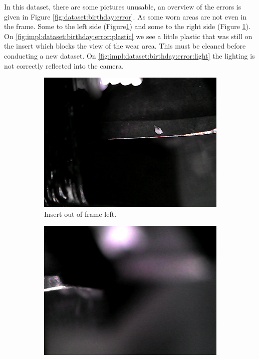In this dataset, there are some pictures unusable, an overview of the errors is given in Figure \ref{fig:dataset:birthday:error}. As some worn areas are not even in the frame. Some to the left side (Figure\ref{fig:impl:dataset:birthday:error:left}) and some to the right side (Figure \ref{fig:impl:dataset:birthday:error:left}). 
On \ref{fig:impl:dataset:birthday:error:plastic} we see a little plastic that was still on the insert which blocks the view of the wear area. This must be cleaned before conducting a new dataset. On \ref{fig:impl:dataset:birthday:error:light} the lighting is not correctly reflected into the camera.

\begin{figure}[hbtp]
	\begin{subfigure}{0.24\textwidth}
		\includegraphics[width=\linewidth, keepaspectratio=true]{./fig/Vision/Dataset/automated_datasets/2_created_datasets/1_Birthday_dataset/b_003_p_010_l_000_nb.png}
		\caption{Insert out of frame left.}
		\label{fig:impl:dataset:birthday:error:left}
	\end{subfigure}
	\hspace*{\fill}
	\begin{subfigure}{0.24\textwidth}
		\includegraphics[width=\linewidth, keepaspectratio=true]{./fig/Vision/Dataset/automated_datasets/2_created_datasets/1_Birthday_dataset/b_003_p_010_l_000_b.png}

\end{subfigure}
\end{figure}
